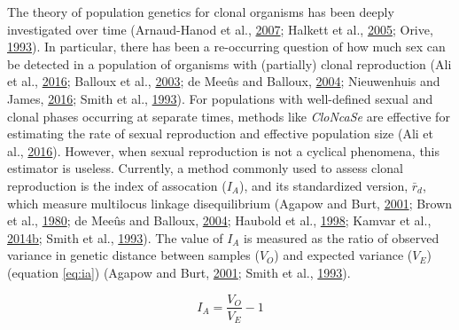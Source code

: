 \documentclass[double,12pt]{beavtex}
\begin{document}
  The theory of population genetics for clonal organisms has been deeply
  investigated over time (Arnaud-Hanod et al.,
  \protect\hyperlink{ref-arnaud2007standardizing}{2007}; Halkett et al.,
  \protect\hyperlink{ref-halkett2005tackling}{2005}; Orive,
  \protect\hyperlink{ref-orive1993effective}{1993}). In particular, there
  has been a re-occurring question of how much sex can be detected in a
  population of organisms with (partially) clonal reproduction (Ali et
  al., \protect\hyperlink{ref-ali2016cloncase}{2016}; Balloux et al.,
  \protect\hyperlink{ref-balloux2003population}{2003}; de Meeûs and
  Balloux, \protect\hyperlink{ref-de2004clonal}{2004}; Nieuwenhuis and
  James, \protect\hyperlink{ref-nieuwenhuis2016frequency}{2016}; Smith et
  al., \protect\hyperlink{ref-smith1993how}{1993}). For populations with
  well-defined sexual and clonal phases occurring at separate times,
  methods like \emph{CloNcaSe} are effective for estimating the rate of
  sexual reproduction and effective population size (Ali et al.,
  \protect\hyperlink{ref-ali2016cloncase}{2016}). However, when sexual
  reproduction is not a cyclical phenomena, this estimator is useless.
  Currently, a method commonly used to assess clonal reproduction is the
  index of assocation (\(I_A\)), and its standardized version,
  \(\bar{r}_d\), which measure multilocus linkage disequilibrium (Agapow
  and Burt, \protect\hyperlink{ref-Agapowux5f2001}{2001}; Brown et al.,
  \protect\hyperlink{ref-brown1980multilocus}{1980}; de Meeûs and Balloux,
  \protect\hyperlink{ref-de2004clonal}{2004}; Haubold et al.,
  \protect\hyperlink{ref-haubold1998detecting}{1998}; Kamvar et al.,
  \protect\hyperlink{ref-kamvar2014poppr}{2014}\protect\hyperlink{ref-kamvar2014poppr}{b};
  Smith et al., \protect\hyperlink{ref-smith1993how}{1993}). The value of
  \(I_A\) is measured as the ratio of observed variance in genetic
  distance between samples (\(V_O\)) and expected variance (\(V_E\))
  (equation \eqref{eq:ia}) (Agapow and Burt,
  \protect\hyperlink{ref-Agapowux5f2001}{2001}; Smith et al.,
  \protect\hyperlink{ref-smith1993how}{1993}).
  
  \begin{equation}
  I_A = \frac{V_O}{V_E} - 1 \label{eq:ia}
  \end{equation}
  
\end{document}
